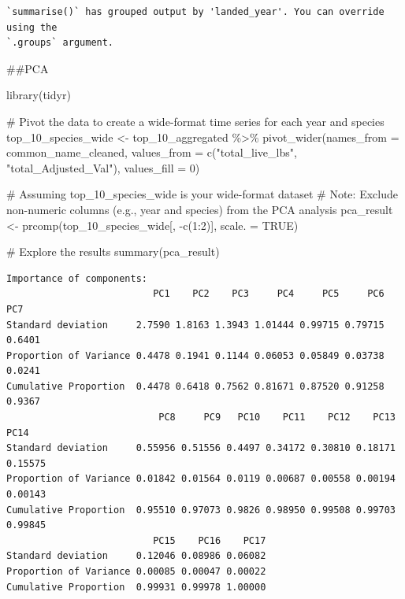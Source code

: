 \documentclass[
  letterpaper,
  DIV=11,
  numbers=noendperiod]{scrartcl}
\newenvironment{Shaded}{\begin{snugshade}}{\end{snugshade}}
\newcommand{\AttributeTok}[1]{\textcolor[rgb]{0.40,0.45,0.13}{#1}}
\newcommand{\CommentTok}[1]{\textcolor[rgb]{0.37,0.37,0.37}{#1}}
\newcommand{\ConstantTok}[1]{\textcolor[rgb]{0.56,0.35,0.01}{#1}}
\newcommand{\DecValTok}[1]{\textcolor[rgb]{0.68,0.00,0.00}{#1}}
\newcommand{\FunctionTok}[1]{\textcolor[rgb]{0.28,0.35,0.67}{#1}}
\newcommand{\NormalTok}[1]{\textcolor[rgb]{0.00,0.23,0.31}{#1}}
\newcommand{\OtherTok}[1]{\textcolor[rgb]{0.00,0.23,0.31}{#1}}
\newcommand{\SpecialCharTok}[1]{\textcolor[rgb]{0.37,0.37,0.37}{#1}}
\newcommand{\StringTok}[1]{\textcolor[rgb]{0.13,0.47,0.30}{#1}}
\begin{document}
\begin{verbatim}
`summarise()` has grouped output by 'landed_year'. You can override using the
`.groups` argument.
\end{verbatim}

\#\#PCA

\begin{Shaded}
\begin{Highlighting}[]
\FunctionTok{library}\NormalTok{(tidyr)}

\CommentTok{\# Pivot the data to create a wide{-}format time series for each year and species}
\NormalTok{top\_10\_species\_wide }\OtherTok{\textless{}{-}}\NormalTok{ top\_10\_aggregated }\SpecialCharTok{\%\textgreater{}\%}
  \FunctionTok{pivot\_wider}\NormalTok{(}\AttributeTok{names\_from =}\NormalTok{ common\_name\_cleaned, }
              \AttributeTok{values\_from =} \FunctionTok{c}\NormalTok{(}\StringTok{"total\_live\_lbs"}\NormalTok{, }\StringTok{"total\_Adjusted\_Val"}\NormalTok{),}
              \AttributeTok{values\_fill =} \DecValTok{0}\NormalTok{)}

\CommentTok{\# Assuming top\_10\_species\_wide is your wide{-}format dataset}
\CommentTok{\# Note: Exclude non{-}numeric columns (e.g., year and species) from the PCA analysis}
\NormalTok{pca\_result }\OtherTok{\textless{}{-}} \FunctionTok{prcomp}\NormalTok{(top\_10\_species\_wide[, }\SpecialCharTok{{-}}\FunctionTok{c}\NormalTok{(}\DecValTok{1}\SpecialCharTok{:}\DecValTok{2}\NormalTok{)], }\AttributeTok{scale. =} \ConstantTok{TRUE}\NormalTok{)}

\CommentTok{\# Explore the results}
\FunctionTok{summary}\NormalTok{(pca\_result)}
\end{Highlighting}
\end{Shaded}

\begin{verbatim}
Importance of components:
                          PC1    PC2    PC3     PC4     PC5     PC6    PC7
Standard deviation     2.7590 1.8163 1.3943 1.01444 0.99715 0.79715 0.6401
Proportion of Variance 0.4478 0.1941 0.1144 0.06053 0.05849 0.03738 0.0241
Cumulative Proportion  0.4478 0.6418 0.7562 0.81671 0.87520 0.91258 0.9367
                           PC8     PC9   PC10    PC11    PC12    PC13    PC14
Standard deviation     0.55956 0.51556 0.4497 0.34172 0.30810 0.18171 0.15575
Proportion of Variance 0.01842 0.01564 0.0119 0.00687 0.00558 0.00194 0.00143
Cumulative Proportion  0.95510 0.97073 0.9826 0.98950 0.99508 0.99703 0.99845
                          PC15    PC16    PC17
Standard deviation     0.12046 0.08986 0.06082
Proportion of Variance 0.00085 0.00047 0.00022
Cumulative Proportion  0.99931 0.99978 1.00000
\end{verbatim}
\end{document}
